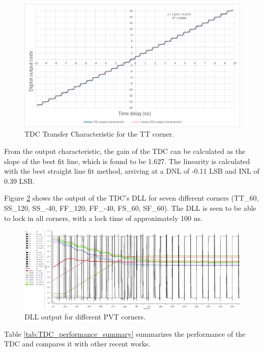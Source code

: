 \begin{figure}[H]
    \centering
    \includegraphics[width=1\textwidth]{figures/TDC_output_characteristic_result.png}
    \caption{TDC Transfer Characteristic for the TT corner.}
    \label{fig:TDC_Transfer_Characteristic}
\end{figure}

From the output characteristic, the gain of the TDC can be calculated as the slope of the best fit line, which is found to be 1.627. The linearity is calculated with the best straight line fit method,
arriving at a DNL of -0.11 LSB and INL of 0.39 LSB.

Figure \ref{fig:DLL_output_PVT} shows the output of the TDC's DLL for seven different corners (TT\_60, SS\_120, SS\_-40, FF\_120, FF\_-40, FS\_60, SF\_60).
The DLL is seen to be able to lock in all corners, with a lock time of approximately 100 ns.

\begin{figure}[H]
    \centering
    \includegraphics[width=1\textwidth]{figures/DLL_PVT2.png}
    \caption{DLL output for different PVT corners.}
    \label{fig:DLL_output_PVT}
\end{figure}

Table \ref{tab:TDC_performance_summary} summarizes the performance of the TDC and compares it with other recent works.


